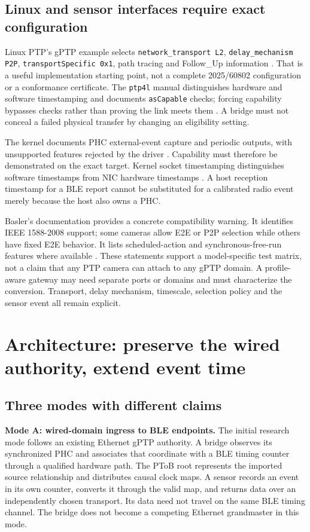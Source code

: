 \documentclass[11pt,letterpaper]{article}
\newcommand{\code}[1]{\texttt{#1}}
\begin{document}
\subsection{Linux and sensor interfaces require exact configuration}
Linux PTP's gPTP example selects \code{network\_transport L2}, \code{delay\_mechanism P2P}, \code{transportSpecific 0x1}, path tracing and Follow\_Up information \cite{gptpconfig}. That is a useful implementation starting point, not a complete 2025/60802 configuration or a conformance certificate. The \code{ptp4l} manual distinguishes hardware and software timestamping and documents \code{asCapable} checks; forcing capability bypasses checks rather than proving the link meets them \cite{ptp4l}. A bridge must not conceal a failed physical transfer by changing an eligibility setting.

The kernel documents PHC external-event capture and periodic outputs, with unsupported features rejected by the driver \cite{phc}. Capability must therefore be demonstrated on the exact target. Kernel socket timestamping distinguishes software timestamps from NIC hardware timestamps \cite{timestamping}. A host reception timestamp for a BLE report cannot be substituted for a calibrated radio event merely because the host also owns a PHC.

Basler's documentation provides a concrete compatibility warning. It identifies IEEE 1588-2008 support; some cameras allow E2E or P2P selection while others have fixed E2E behavior. It lists scheduled-action and synchronous-free-run features where available \cite{basler}. These statements support a model-specific test matrix, not a claim that any PTP camera can attach to any gPTP domain. A profile-aware gateway may need separate ports or domains and must characterize the conversion. Transport, delay mechanism, timescale, selection policy and the sensor event all remain explicit.

\section{Architecture: preserve the wired authority, extend event time}\label{sec:architecture}
\subsection{Three modes with different claims}
\textbf{Mode A: wired-domain ingress to BLE endpoints.} The initial research mode follows an existing Ethernet gPTP authority. A bridge observes its synchronized PHC and associates that coordinate with a BLE timing counter through a qualified hardware path. The PToB root represents the imported source relationship and distributes causal clock maps. A sensor records an event in its own counter, converts it through the valid map, and returns data over an independently chosen transport. Its data need not travel on the same BLE timing channel. The bridge does not become a competing Ethernet grandmaster in this mode.
\end{document}
